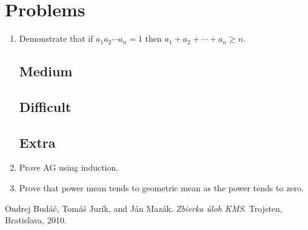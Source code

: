 \documentclass[11pt,a5paper]{article}
\begin{document}
\section{Problems}

\begin{enumerate}
	\subsection*{Easy}
	\item{Demonstrate that if $a_1a_2\cdots a_n=1$ then 
	$a_1+a_2+\cdots +a_n\ge n$.}

	\subsection*{Medium}
	
	\subsection*{Difficult}

	\subsection*{Extra}	
	\item{Prove AG using induction.}
	
	\item{Prove that power mean tends to geometric mean as the power 
	tends to zero.}
\end{enumerate}

\begin{thebibliography}{9}
 Ondrej Budáč, Tomáš Jurík, and Ján Mazák. 
	\emph{Zbierka úloh KMS}. Trojsten, Bratislava, 2010.

\end{thebibliography}
\end{document}
